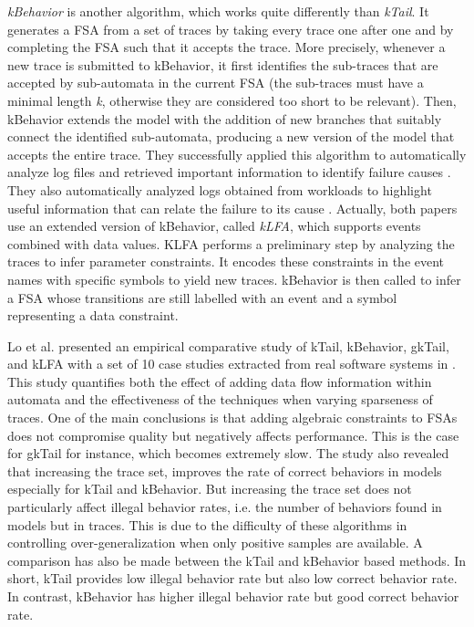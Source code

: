 \textit{kBehavior} \cite{mariani2007dynamic} is another algorithm, which works quite differently than \textit{kTail}. It generates a FSA from a set of traces by taking every trace one after one and by completing the FSA such that it accepts the trace. More precisely, whenever a new trace is submitted to kBehavior, it first identifies the sub-traces that are
accepted by sub-automata in the current FSA (the sub-traces
must have a minimal length \textit{k}, otherwise they are
considered too short to be relevant). Then, kBehavior extends the model  with the addition of new branches that suitably connect
the identified sub-automata, producing a new version of the
model  that accepts the entire trace. They successfully
applied this algorithm to automatically analyze log files and
retrieved important information to identify failure causes
\cite{4700316}. They also automatically analyzed logs obtained
from workloads to highlight useful information that can relate
the failure to its cause \cite{cotroneo2007investigation}. Actually, both papers \cite{4700316,cotroneo2007investigation} use an extended version of kBehavior, called \textit{kLFA}, which supports events combined with data values. KLFA performs a preliminary step by analyzing the traces to infer parameter constraints. It encodes these constraints in the event names with specific symbols to yield new traces. kBehavior is then called to infer a FSA whose transitions are still labelled with an event and a symbol representing a data constraint.

Lo et al. presented an empirical comparative study of  kTail, kBehavior, gkTail, and kLFA with a set
of 10 case studies extracted from real software systems in
\cite{Lo20122063}. This study quantifies
both the effect of adding data flow information within automata
and the effectiveness of the techniques when varying sparseness
of traces. One of the main conclusions is that adding algebraic
constraints to FSAs does not compromise quality but negatively
affects performance. This is the case for gkTail for instance,
which becomes extremely slow. The study also revealed that increasing the trace set, improves the rate of correct behaviors in models especially for kTail and kBehavior. But increasing the trace set does not particularly affect illegal behavior rates, i.e. the number of behaviors found in models but in traces. This is due to the difficulty of these algorithms in controlling over-generalization when only positive samples are available. A comparison has also be made between the kTail and kBehavior based methods. In short, kTail provides low illegal behavior rate but also low correct behavior rate. In contrast, kBehavior has higher illegal behavior rate but good correct behavior rate.


